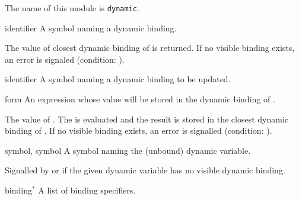 %
\begin{optDefinition}
%
The name of this module is {\tt dynamic}.
%
%
\Syntax
{}%
%
\begin{arguments}
    \item[identifier] A symbol naming a dynamic binding.
\end{arguments}
%
\result%
The value of closest dynamic binding of  is returned.  If no
visible binding exists, an error is signaled (condition:
).

%
\Syntax
{}%
%
\begin{arguments}
    \item[identifier] A symbol naming a dynamic binding to be updated.

    \item[form] An expression whose value will be stored in the dynamic binding
    of .
\end{arguments}
%
\result%
The value of .
%
\remarks%
The  is evaluated and the result is stored in the closest dynamic
binding of .  If no visible binding exists, an error is
signalled (condition: 
).

%
\begin{initoptions}
    \item[symbol, symbol] A symbol naming the (unbound) dynamic variable.
\end{initoptions}
%
\remarks%
Signalled by  or  if the given
dynamic variable has no visible dynamic binding.

%
\Syntax
{}%
%
\begin{arguments}
    \item[binding\/$^*$] A list of binding specifiers.


\end{arguments}
\end{optDefinition}
